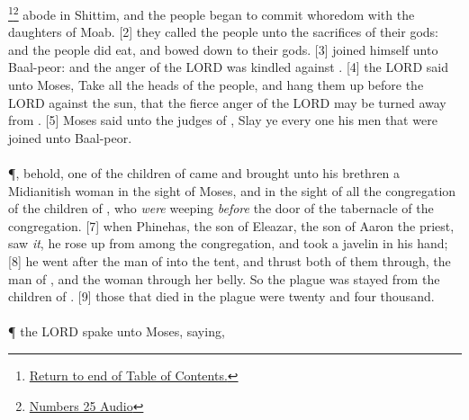 \footnote{\textcolor[rgb]{0.00,0.25,0.00}{\hyperlink{TOC}{Return to end of Table of Contents.}}}\footnote{\href{https://audiobible.com/bible/numbers_25.html}{\textcolor[cmyk]{0.99998,1,0,0}{Numbers 25 Audio}}}\textcolor[cmyk]{0.99998,1,0,0}{  abode in Shittim, and the people began to commit whoredom with the daughters of Moab.}
[2] \textcolor[cmyk]{0.99998,1,0,0}{ they called the people unto the sacrifices of their gods: and the people did eat, and bowed down to their gods.}
[3] \textcolor[cmyk]{0.99998,1,0,0}{  joined himself unto Baal-peor: and the anger of the LORD was kindled against .}
[4] \textcolor[cmyk]{0.99998,1,0,0}{ the LORD said unto Moses, Take all the heads of the people, and hang them up before the LORD against the sun, that the fierce anger of the LORD may be turned away from .}
[5] \textcolor[cmyk]{0.99998,1,0,0}{ Moses said unto the judges of , Slay ye every one his men that were joined unto Baal-peor.}\\
\\
\P \textcolor[cmyk]{0.99998,1,0,0}{, behold, one of the children of  came and brought unto his brethren a Midianitish woman in the sight of Moses, and in the sight of all the congregation of the children of , who \emph{were} weeping \emph{before} the door of the tabernacle of the congregation.}
[7] \textcolor[cmyk]{0.99998,1,0,0}{ when Phinehas, the son of Eleazar, the son of Aaron the priest, saw \emph{it}, he rose up from among the congregation, and took a javelin in his hand;}
[8] \textcolor[cmyk]{0.99998,1,0,0}{ he went after the man of  into the tent, and thrust both of them through, the man of , and the woman through her belly. So the plague was stayed from the children of .}
[9] \textcolor[cmyk]{0.99998,1,0,0}{ those that died in the plague were twenty and four thousand.}\\
\\
\P  \textcolor[cmyk]{0.99998,1,0,0}{ the LORD spake unto Moses, saying,}

